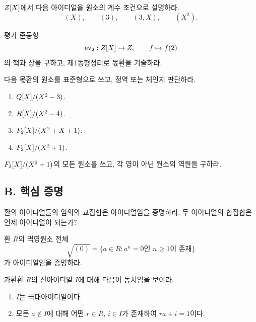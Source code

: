 \begin{exercise}
$Z[X]$에서 다음 아이디얼을 원소의 계수 조건으로 설명하라.
\[
  (X),\qquad (3),\qquad (3,X),\qquad (X^2).
\]
\end{exercise}

\begin{exercise}[*]
평가 준동형
\[
  \operatorname{ev}_2:Z[X]\to Z,\qquad f\mapsto f(2)
\]
의 핵과 상을 구하고, 제1동형정리로 몫환을 기술하라.
\end{exercise}

\begin{exercise}
다음 몫환의 원소를 표준형으로 쓰고, 정역 또는 체인지 판단하라.
\begin{enumerate}[label=(\alph*)]
  \item $Q[X]/(X^2-3)$.
  \item $R[X]/(X^2-4)$.
  \item $F_2[X]/(X^2+X+1)$.
  \item $F_2[X]/(X^2+1)$.
\end{enumerate}
\end{exercise}

\begin{exercise}[*]
$F_3[X]/(X^2+1)$의 모든 원소를 쓰고, 각 영이 아닌 원소의 역원을 구하라.
\end{exercise}

\subsection*{B. 핵심 증명}

\begin{exercise}
환의 아이디얼들의 임의의 교집합은 아이디얼임을 증명하라. 두 아이디얼의 합집합은 언제 아이디얼이 되는가?
\end{exercise}

\begin{exercise}[*]
환 $R$의 멱영원소 전체
\[
  \sqrt{(0)}=\{a\in R:a^n=0\text{인 }n\ge1\text{이 존재}\}
\]
가 아이디얼임을 증명하라.
\end{exercise}

\begin{exercise}
가환환 $R$의 진아이디얼 $I$에 대해 다음이 동치임을 보이라.
\begin{enumerate}[label=(\roman*)]
  \item $I$는 극대아이디얼이다.
  \item 모든 $a\notin I$에 대해 어떤 $r\in R$, $i\in I$가 존재하여 $ra+i=1$이다.
\end{enumerate}
\end{exercise}


